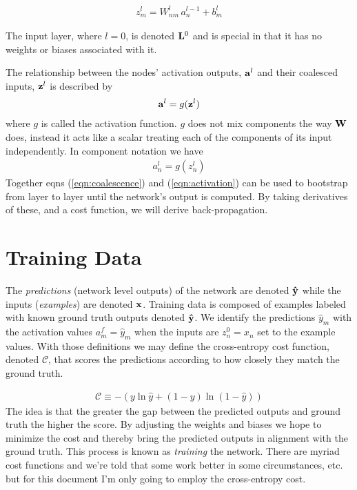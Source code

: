 \documentclass[twocolumn]{revtex4-1}
\newcommand{\bld}[1]{\vectorbold{#1}}
\begin{document}
\begin{align}
    \label{eqn:componentCoalescence}
    z^l_m = W^l_{n m} \, a^{l - 1}_n + b^{l}_m
\end{align}

The input layer, where $l = 0$, is denoted $\bld{L}^0$ and is special in that it has no weights or biases associated with it.

The relationship between the nodes' activation outputs, $\bld{a}^l$ and their coalesced inputs, $\bld{z}^l$ is described by
\begin{align}
    \label{eqn:activation}
    \bld{a}^l = g(\bld{z}^l)
\end{align}
where $g$ is called the activation function. $g$ does not mix components the way $\bld{W}$ does, instead it acts like a scalar treating each of the components of its input independently. In component notation we have
\begin{align}
    a^l_n = g(z^l_n)
\end{align}
Together eqns (\ref{eqn:coalescence}) and (\ref{eqn:activation}) can be used to bootstrap from layer to layer until the network's output is computed. By taking derivatives of these, and a cost function, we will derive back-propagation.

\section{Training Data}
The \textit{predictions} (network level outputs) of the network are denoted $\bld{\hat{y}}$ while the inputs (\textit{examples}) are denoted $\bld{x}$. Training data is composed of examples labeled with known ground truth outputs denoted $\bld{\hat{y}}$. We identify the predictions $\hat{y}_m$ with the activation values $a^f_m = \hat{y}_m$ when the inputs are $z^0_n = x_n$ set to the example values. With those definitions we may define the cross-entropy cost function, denoted $\mathscr{C}$, that scores the predictions according to how closely they match the ground truth.

\begin{align}
    \label{eqn:costDefn}
    \mathscr{C} \equiv - \left(y \ln \hat{y} + (1 - y) \ln (1 - \hat{y}) \right)
\end{align}
The idea is that the greater the gap between the predicted outputs and ground truth the higher the score. By adjusting the weights and biases we hope to minimize the cost and thereby bring the predicted outputs in alignment with the ground truth. This process is known as \textit{training} the network. There are myriad cost functions and we're told that some work better in some circumstances, etc. but for this document I'm only going to employ the cross-entropy cost.
\end{document}

